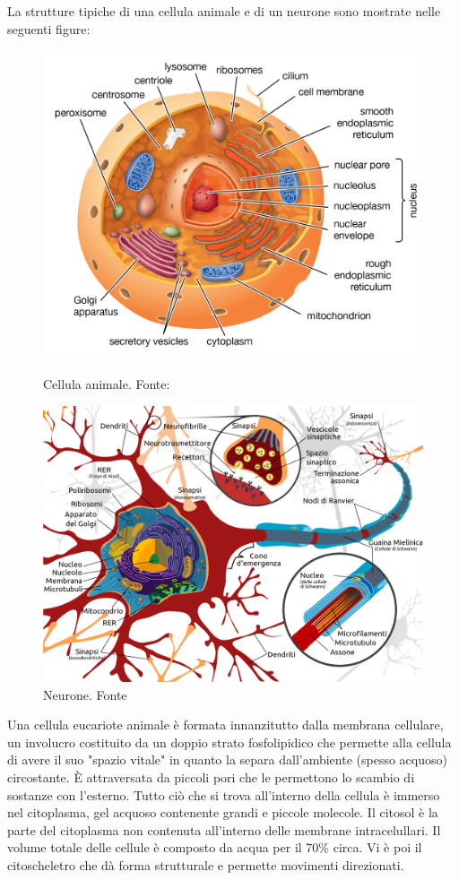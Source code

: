 La strutture tipiche di una cellula animale e di un neurone sono mostrate nelle seguenti figure:
\begin{figure}[!htb]
	\centering
	\includegraphics[scale=0.14]{images/cellula-eucariotica2.png}
	\caption{Cellula animale. Fonte: \cite{eukaryoteBritannica}}
	\label{fig:cellula-animale}
	\endminipage\hfill
	\centering
	\includegraphics[scale=0.155]{images/neurone.png}
	\caption{Neurone. Fonte \cite{neuroneWiki}}
	\label{fig:neurone}
	\endminipage\hfill
\end{figure}

Una cellula eucariote animale è formata innanzitutto dalla membrana cellulare, un involucro costituito da un doppio strato fosfolipidico che permette alla cellula di avere il suo "spazio vitale" in quanto la separa dall'ambiente (spesso acquoso) circostante. È attraversata da piccoli pori che le permettono lo scambio di sostanze con l'esterno. Tutto ciò che si trova all'interno della cellula è immerso nel citoplasma, gel acquoso contenente grandi e piccole molecole. Il citosol è la parte del citoplasma non contenuta all'interno delle membrane intracelullari. Il volume totale delle cellule è composto da acqua per il 70\% circa. Vi è poi il citoscheletro che dà forma strutturale e permette movimenti direzionati. 

